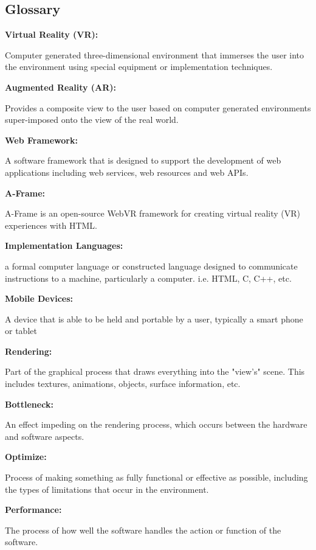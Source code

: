 \documentclass[letterpaper,10pt,titlepage,draftclsnofoot,onecolumn,compsoc,utf8,latin1]{IEEEtran}
\begin{document}
\subsection{Glossary}
\begin{singlespace}
\begin{enumerate}[labelsep=2em,leftmargin=.5in]
    {\item \bfseries Virtual Reality (VR): } Computer generated three-dimensional environment that immerses the user into the environment using special equipment or implementation techniques. \\
    {\item \bfseries Augmented Reality (AR): } Provides a composite view to the user based on computer generated environments super-imposed onto the view of the real world. \\
    {\item \bfseries Web Framework: } A software framework that is designed to support the development of web applications including web services, web resources and web APIs. \\
    {\item \bfseries A-Frame: } A-Frame is an open-source WebVR framework for creating virtual reality (VR) experiences with HTML.\\
    {\item \bfseries Implementation Languages: } a formal computer language or constructed language designed to communicate instructions to a machine, particularly a computer. i.e. HTML, C, C++, etc. \\
    {\item \bfseries Mobile Devices: } A device that is able to be held and portable by a user, typically a smart phone or tablet \\
    {\item \bfseries Rendering: } Part of the graphical process that draws everything into the "view's" scene. This includes textures, animations, objects, surface information, etc. \\
    {\item \bfseries Bottleneck: } An effect impeding on the rendering process, which occurs between the hardware and software aspects. \\
    {\item \bfseries Optimize: } Process of making something as fully functional or effective as possible, including the types of limitations that occur in the environment. \\
    {\item \bfseries Performance: } The process of how well the software handles the action or function of the software.
\end{enumerate}

\end{singlespace}
\end{document}
